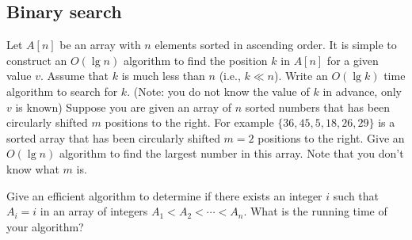 \subsection{Binary search}
\begin{Exercise}
\Question Let $A[n]$ be an array with $n$ elements sorted in ascending order. It is simple to construct an $O(\lg n)$ algorithm to find the position $k$ in $A[n]$ for a given value $v$. Assume that $k$ is much less than $n$ (i.e., $k \ll n$). Write an $O(\lg k)$ time algorithm to search for $k$.
(Note: you do not know the value of $k$ in advance, only $v$ is known) \label{sequence:exponential-search}
\Question Suppose you are given an array of $n$ sorted numbers that has been circularly shifted $m$ positions to the right. For example $\{36, 45, 5, 18, 26, 29\}$ is a sorted array that has been circularly shifted $m = 2$ positions to the right. Give an $O(\lg n)$ algorithm to find the largest number in this array. Note that you don't know what $m$ is. \label{sequence:shift}
\item Give an efficient algorithm to determine if there exists an integer $i$ such that $A_i = i$ in an array of integers $A_1 < A_2 < \cdots < A_n$. What is the running time of your algorithm? \label{sequence:fixed-point}
\end{Exercise}
